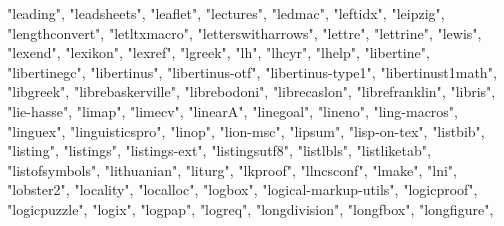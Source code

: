 \documentclass[
]{article}
\newenvironment{Shaded}{\begin{snugshade}}{\end{snugshade}}
\newcommand{\NormalTok}[1]{#1}
\newcommand{\StringTok}[1]{\textcolor[rgb]{0.31,0.60,0.02}{#1}}
\begin{document}
\begin{Shaded}
\begin{Highlighting}[]
\StringTok{"leading"}\NormalTok{, }\StringTok{"leadsheets"}\NormalTok{, }\StringTok{"leaflet"}\NormalTok{, }\StringTok{"lectures"}\NormalTok{, }\StringTok{"ledmac"}\NormalTok{, }\StringTok{"leftidx"}\NormalTok{, }
\StringTok{"leipzig"}\NormalTok{, }\StringTok{"lengthconvert"}\NormalTok{, }\StringTok{"letltxmacro"}\NormalTok{, }\StringTok{"letterswitharrows"}\NormalTok{, }
\StringTok{"lettre"}\NormalTok{, }\StringTok{"lettrine"}\NormalTok{, }\StringTok{"lewis"}\NormalTok{, }\StringTok{"lexend"}\NormalTok{, }\StringTok{"lexikon"}\NormalTok{, }\StringTok{"lexref"}\NormalTok{, }
\StringTok{"lgreek"}\NormalTok{, }\StringTok{"lh"}\NormalTok{, }\StringTok{"lhcyr"}\NormalTok{, }\StringTok{"lhelp"}\NormalTok{, }\StringTok{"libertine"}\NormalTok{, }\StringTok{"libertinegc"}\NormalTok{, }
\StringTok{"libertinus"}\NormalTok{, }\StringTok{"libertinus{-}otf"}\NormalTok{, }\StringTok{"libertinus{-}type1"}\NormalTok{, }\StringTok{"libertinust1math"}\NormalTok{, }
\StringTok{"libgreek"}\NormalTok{, }\StringTok{"librebaskerville"}\NormalTok{, }\StringTok{"librebodoni"}\NormalTok{, }\StringTok{"librecaslon"}\NormalTok{, }
\StringTok{"librefranklin"}\NormalTok{, }\StringTok{"libris"}\NormalTok{, }\StringTok{"lie{-}hasse"}\NormalTok{, }\StringTok{"limap"}\NormalTok{, }\StringTok{"limecv"}\NormalTok{, }\StringTok{"linearA"}\NormalTok{, }
\StringTok{"linegoal"}\NormalTok{, }\StringTok{"lineno"}\NormalTok{, }\StringTok{"ling{-}macros"}\NormalTok{, }\StringTok{"linguex"}\NormalTok{, }\StringTok{"linguisticspro"}\NormalTok{, }
\StringTok{"linop"}\NormalTok{, }\StringTok{"lion{-}msc"}\NormalTok{, }\StringTok{"lipsum"}\NormalTok{, }\StringTok{"lisp{-}on{-}tex"}\NormalTok{, }\StringTok{"listbib"}\NormalTok{, }\StringTok{"listing"}\NormalTok{, }
\StringTok{"listings"}\NormalTok{, }\StringTok{"listings{-}ext"}\NormalTok{, }\StringTok{"listingsutf8"}\NormalTok{, }\StringTok{"listlbls"}\NormalTok{, }\StringTok{"listliketab"}\NormalTok{, }
\StringTok{"listofsymbols"}\NormalTok{, }\StringTok{"lithuanian"}\NormalTok{, }\StringTok{"liturg"}\NormalTok{, }\StringTok{"lkproof"}\NormalTok{, }\StringTok{"llncsconf"}\NormalTok{, }
\StringTok{"lmake"}\NormalTok{, }\StringTok{"lni"}\NormalTok{, }\StringTok{"lobster2"}\NormalTok{, }\StringTok{"locality"}\NormalTok{, }\StringTok{"localloc"}\NormalTok{, }\StringTok{"logbox"}\NormalTok{, }
\StringTok{"logical{-}markup{-}utils"}\NormalTok{, }\StringTok{"logicproof"}\NormalTok{, }\StringTok{"logicpuzzle"}\NormalTok{, }\StringTok{"logix"}\NormalTok{, }
\StringTok{"logpap"}\NormalTok{, }\StringTok{"logreq"}\NormalTok{, }\StringTok{"longdivision"}\NormalTok{, }\StringTok{"longfbox"}\NormalTok{, }\StringTok{"longfigure"}\NormalTok{, }

\end{Highlighting}
\end{Shaded}
\end{document}
